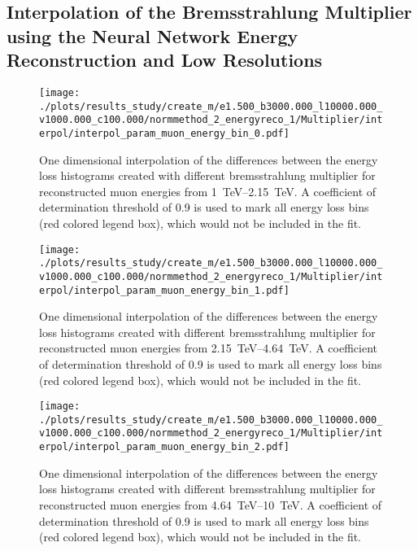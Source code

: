 %

\subsection*{Interpolation of the Bremsstrahlung Multiplier using the Neural Network Energy Reconstruction and Low Resolutions}

\begin{figure}[H]
    \centering
    \texttt{[image: ./plots/results\_study/create\_m/e1.500\_b3000.000\_l10000.000\_v1000.000\_c100.000/normmethod\_2\_energyreco\_1/Multiplier/interpol/interpol\_param\_muon\_energy\_bin\_0.pdf]}
    \caption{One dimensional interpolation of the differences between the energy loss histograms created with different bremsstrahlung multiplier for reconstructed muon energies from \SIrange{1}{2.15}{TeV}. A coefficient of determination threshold of \num{0.9} is used to mark all energy loss bins (red colored legend box), which would not be included in the fit.}
    \label{fig:study_1d_interpol_mu0_nn_low}
\end{figure}

\begin{figure}[H]
    \centering
    \texttt{[image: ./plots/results\_study/create\_m/e1.500\_b3000.000\_l10000.000\_v1000.000\_c100.000/normmethod\_2\_energyreco\_1/Multiplier/interpol/interpol\_param\_muon\_energy\_bin\_1.pdf]}
    \caption{One dimensional interpolation of the differences between the energy loss histograms created with different bremsstrahlung multiplier for reconstructed muon energies from \SIrange{2.15}{4.64}{TeV}. A coefficient of determination threshold of \num{0.9} is used to mark all energy loss bins (red colored legend box), which would not be included in the fit.}
    \label{fig:study_1d_interpol_mu1_nn_low}
\end{figure}

\begin{figure}[H]
    \centering
    \texttt{[image: ./plots/results\_study/create\_m/e1.500\_b3000.000\_l10000.000\_v1000.000\_c100.000/normmethod\_2\_energyreco\_1/Multiplier/interpol/interpol\_param\_muon\_energy\_bin\_2.pdf]}
    \caption{One dimensional interpolation of the differences between the energy loss histograms created with different bremsstrahlung multiplier for reconstructed muon energies from \SIrange{4.64}{10}{TeV}. A coefficient of determination threshold of \num{0.9} is used to mark all energy loss bins (red colored legend box), which would not be included in the fit.}
    \label{fig:study_1d_interpol_mu2_nn_low}
\end{figure}

